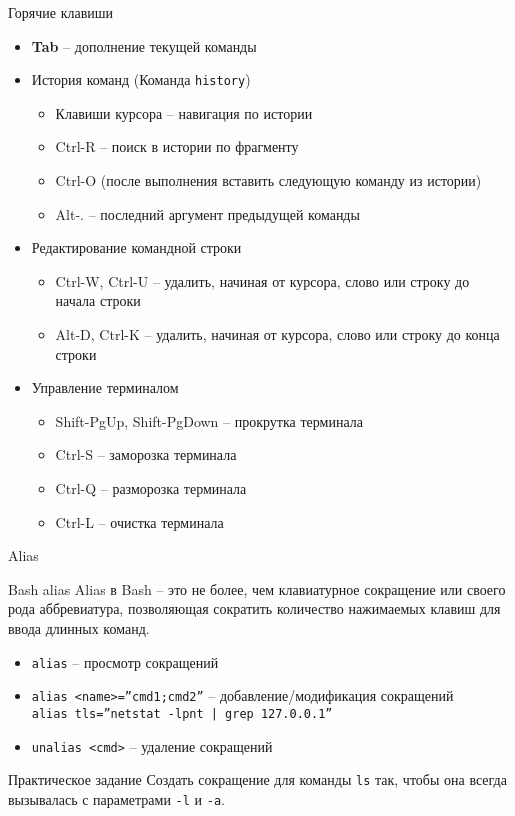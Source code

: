 \begin{frame}{Горячие клавиши}
  \begin{itemize}
    \item \textbf{Tab} -- дополнение текущей команды
      \pause
    \item История команд (Команда {\tt history})
      \begin{itemize}
        \item Клавиши курсора -- навигация по истории
        \item Ctrl-R -- поиск в истории по фрагменту
        \item Ctrl-O (после выполнения вставить следующую команду из истории)
        \item Alt-.  -- последний аргумент предыдущей команды
      \end{itemize}
    \item Редактирование командной строки
      \begin{itemize}
        \item Ctrl-W, Ctrl-U -- удалить, начиная от курсора, слово или строку до начала строки
        \item Alt-D, Ctrl-K -- удалить, начиная от курсора, слово или строку до конца строки
      \end{itemize}
    \item Управление терминалом
      \begin{itemize}
        \item Shift-PgUp, Shift-PgDown -- прокрутка терминала
        \item Ctrl-S -- заморозка терминала
        \item Ctrl-Q -- разморозка терминала
        \item Ctrl-L -- очистка терминала
      \end{itemize}
  \end{itemize}
\end{frame}

\begin{frame}{Alias}
  \begin{block}{Bash alias}
    Alias в Bash -- это не более, чем клавиатурное сокращение или своего рода аббревиатура, 
    позволяющая сократить количество нажимаемых клавиш для ввода длинных команд.

    \begin{itemize}
        \item {\tt alias} -- просмотр сокращений
	\item {\tt alias <name>=''cmd1;cmd2''} -- добавление/модификация сокращений \\
	      {\tt alias tls=''netstat -lpnt | grep 127.0.0.1''}
        \item {\tt unalias <cmd>} -- удаление сокращений
    \end{itemize}
  \end{block}

  \pause
  \begin{block}{Практическое задание}
  Создать сокращение для команды {\tt ls} так, чтобы она всегда вызывалась с параметрами {\tt -l} и {\tt -a}.
  \end{block}

\end{frame}

